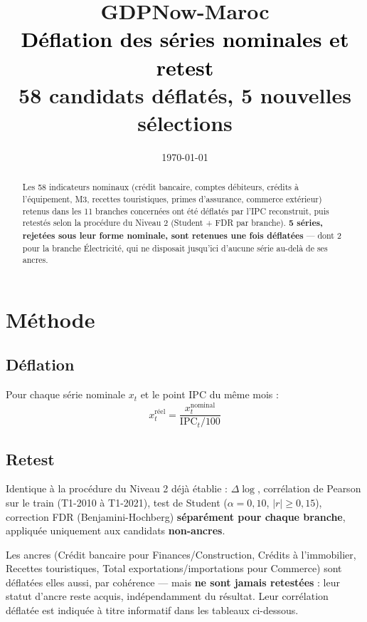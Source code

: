 \documentclass[11pt,a4paper]{article}
\title{\vspace{-1.3cm}\textcolor{bleuprincip}{\Huge\bfseries GDPNow-Maroc}\\[0.3cm]
\textcolor{black}{\Large Déflation des séries nominales et retest}\\[0.15cm]
\textcolor{violetselect}{\large 58 candidats déflatés, 5 nouvelles sélections}}
\author{}
\date{\today}
\begin{document}
\maketitle
\thispagestyle{empty}

\begin{abstract}
\noindent Les 58 indicateurs nominaux (crédit bancaire, comptes débiteurs, crédits à l'équipement, M3, recettes touristiques, primes d'assurance, commerce extérieur) retenus dans les 11 branches concernées ont été déflatés par l'IPC reconstruit, puis retestés selon la procédure du Niveau 2 (Student + FDR par branche). \textbf{5 séries, rejetées sous leur forme nominale, sont retenues une fois déflatées} --- dont 2 pour la branche Électricité, qui ne disposait jusqu'ici d'aucune série au-delà de ses ancres.
\end{abstract}

\tableofcontents
\vspace{0.3cm}

\section{Méthode}

\subsection{Déflation}

Pour chaque série nominale $x_t$ et le point IPC du même mois :
\begin{equation}
x_t^{\text{réel}} = \frac{x_t^{\text{nominal}}}{\text{IPC}_t / 100}
\end{equation}

\subsection{Retest}

Identique à la procédure du Niveau 2 déjà établie : $\Delta\log$, corrélation de Pearson sur le train (T1-2010 à T1-2021), test de Student ($\alpha=0{,}10$, $|r|\geq0{,}15$), correction FDR (Benjamini-Hochberg) \textbf{séparément pour chaque branche}, appliquée uniquement aux candidats \textbf{non-ancres}.

\begin{noteboxbleu}
Les ancres (Crédit bancaire pour Finances/Construction, Crédits à l'immobilier, Recettes touristiques, Total exportations/importations pour Commerce) sont déflatées elles aussi, par cohérence --- mais \textbf{ne sont jamais retestées} : leur statut d'ancre reste acquis, indépendamment du résultat. Leur corrélation déflatée est indiquée à titre informatif dans les tableaux ci-dessous.
\end{noteboxbleu}
\end{document}
